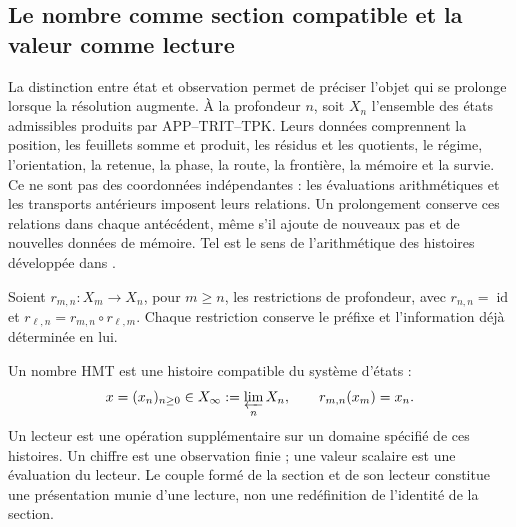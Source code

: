 
\subsection{Le nombre comme section compatible et la valeur comme lecture}
\label{hist:seccion}

La distinction entre état et observation permet de préciser l’objet qui se
prolonge lorsque la résolution augmente. À la profondeur \(n\), soit \(X_n\)
l’ensemble des états admissibles produits par APP--TRIT--TPK. Leurs données
comprennent la position, les feuillets somme et produit, les résidus et les quotients, le régime,
l’orientation, la retenue, la phase, la route, la frontière, la mémoire et la survie. Ce ne sont
pas des coordonnées indépendantes : les évaluations arithmétiques et les transports
antérieurs imposent leurs relations. Un prolongement conserve ces relations
dans chaque antécédent, même s’il ajoute de nouveaux pas et de nouvelles données de mémoire.
Tel est le sens de l’arithmétique des histoires développée dans
\cite{hmtintegral,hmtholonomia}.

Soient \(r_{m,n}:X_m\to X_n\), pour \(m\geq n\), les restrictions de
profondeur, avec \(r_{n,n}=\operatorname{id}\) et
\(r_{\ell,n}=r_{m,n}\circ r_{\ell,m}\). Chaque restriction conserve le
préfixe et l’information déjà déterminée en lui.

\begin{definition}
Un nombre HMT est une histoire compatible du système d’états :
\begin{equation}
 x=(x_n)_{n\geq0}\in X_\infty:=\varprojlim_n X_n,
 \qquad r_{m,n}(x_m)=x_n.
 \label{hist:limite-inverso}
\end{equation}
Un lecteur est une opération supplémentaire sur un domaine spécifié de ces
histoires. Un chiffre est une observation finie ; une valeur scalaire est une
évaluation du lecteur. Le couple formé de la section et de son lecteur constitue
une présentation munie d’une lecture, non une redéfinition de l’identité de la section.
\end{definition}

